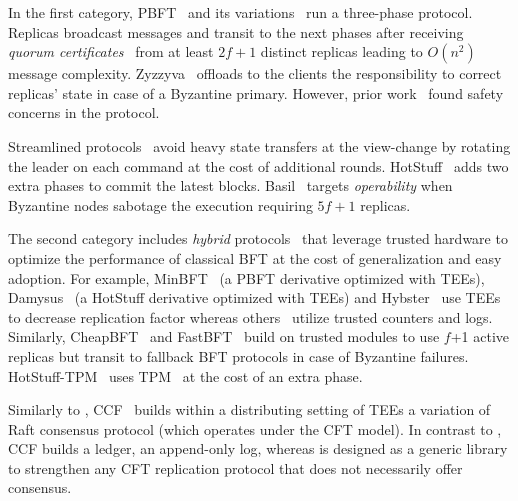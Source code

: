 


 In the first category, PBFT~\cite{Castro:2002} and its variations~\cite{CFF} run a three-phase protocol. Replicas broadcast messages and transit to the next phases after receiving {\emph{quorum certificates}}~\cite{Castro2002} from at least $2f+1$ distinct replicas leading to $O(n^2)$ message complexity. Zyzzyva~\cite{10.1145/1658357.1658358} offloads to the clients the responsibility to correct replicas' state in case of a Byzantine primary. However, prior work~\cite{unsafeZyzzyva} found safety concerns in the protocol.

Streamlined protocols~\cite{DBLP:journals/corr/abs-1803-05069, Chan2018PaLaAS, DBLP:journals/corr/abs-1807-04938, Chan2018PiLiAE} avoid heavy state transfers at the view-change by rotating the leader on each command at the cost of additional rounds. HotStuff~\cite{DBLP:journals/corr/abs-1803-05069} adds two extra phases to commit the latest blocks. Basil~\cite{Suri_Payer_2021} targets \emph{operability} when Byzantine nodes sabotage the execution requiring $5f+1$ replicas.


 The second category includes {\emph{hybrid}} protocols~\cite{10.1145/3492321.3519568, minBFT, 10.1145/3552326.3587455, 10.1145/3492321.3519568, treaty, avocado, ccf} that leverage trusted hardware to optimize the performance of classical BFT at the cost of generalization and easy adoption. For example, MinBFT~\cite{minBFT} (a PBFT derivative optimized with TEEs), Damysus~\cite{10.1145/3492321.3519568} (a HotStuff derivative optimized with TEEs) and Hybster~\cite{hybster} use TEEs to decrease replication factor whereas others~\cite{levin2009trinc, 10.1145/1323293.1294280, yandamuri} utilize trusted counters and logs. Similarly, CheapBFT~\cite{10.1145/2168836.2168866} and FastBFT~\cite{DBLP:journals/corr/LiuLKA16a} build on trusted modules to use $f$+1 active replicas but transit to fallback BFT protocols in case of Byzantine failures. HotStuff-TPM~\cite{DBLP:journals/corr/abs-1803-05069} uses TPM~\cite{10.1109/SP.2010.32} at the cost of an extra phase. 

Similarly to \projecttitle{}, CCF~\cite{ccf} builds within a distributing setting of TEEs a variation of Raft consensus protocol (which operates under the CFT model). In contrast to \projecttitle{}, CCF builds a ledger, an append-only log, whereas \projecttitle{} is designed as a generic library to strengthen any CFT replication protocol that does not necessarily offer consensus.


